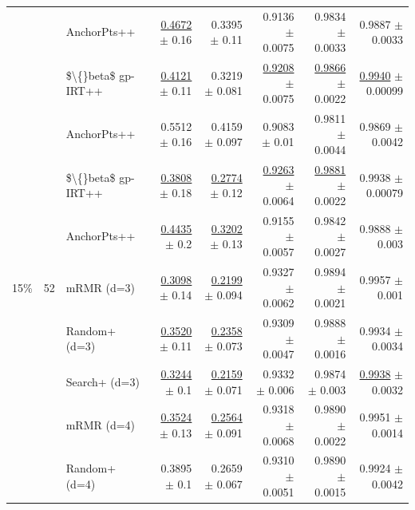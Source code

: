 \begin{longtable}{llp{}rrrrr}
 &  & AnchorPts++ & \underline{0.4672} {\scriptsize $\pm$ 0.16} & 0.3395 {\scriptsize $\pm$ 0.11} & 0.9136 {\scriptsize $\pm$ 0.0075} & 0.9834 {\scriptsize $\pm$ 0.0033} & 0.9887 {\scriptsize $\pm$ 0.0033} \\
 &  & \$\textbackslash\{\}beta\$ gp-IRT++ & \underline{0.4121} {\scriptsize $\pm$ 0.11} & 0.3219 {\scriptsize $\pm$ 0.081} & \underline{0.9208} {\scriptsize $\pm$ 0.0075} & \underline{0.9866} {\scriptsize $\pm$ 0.0022} & \underline{0.9940} {\scriptsize $\pm$ 0.00099} \\
 &  & AnchorPts++ & 0.5512 {\scriptsize $\pm$ 0.16} & 0.4159 {\scriptsize $\pm$ 0.097} & 0.9083 {\scriptsize $\pm$ 0.01} & 0.9811 {\scriptsize $\pm$ 0.0044} & 0.9869 {\scriptsize $\pm$ 0.0042} \\
 &  & \$\textbackslash\{\}beta\$ gp-IRT++ & \underline{0.3808} {\scriptsize $\pm$ 0.18} & \underline{0.2774} {\scriptsize $\pm$ 0.12} & \underline{0.9263} {\scriptsize $\pm$ 0.0064} & \underline{0.9881} {\scriptsize $\pm$ 0.0022} & 0.9938 {\scriptsize $\pm$ 0.00079} \\
 &  & AnchorPts++ & \underline{0.4435} {\scriptsize $\pm$ 0.2} & \underline{0.3202} {\scriptsize $\pm$ 0.13} & 0.9155 {\scriptsize $\pm$ 0.0057} & 0.9842 {\scriptsize $\pm$ 0.0027} & 0.9888 {\scriptsize $\pm$ 0.003} \\
\midrule
15\% & 52 & mRMR (d=3) & \underline{0.3098} {\scriptsize $\pm$ 0.14} & \underline{0.2199} {\scriptsize $\pm$ 0.094} & 0.9327 {\scriptsize $\pm$ 0.0062} & 0.9894 {\scriptsize $\pm$ 0.0021} & 0.9957 {\scriptsize $\pm$ 0.001} \\
 &  & Random+ (d=3) & \underline{0.3520} {\scriptsize $\pm$ 0.11} & \underline{0.2358} {\scriptsize $\pm$ 0.073} & 0.9309 {\scriptsize $\pm$ 0.0047} & 0.9888 {\scriptsize $\pm$ 0.0016} & 0.9934 {\scriptsize $\pm$ 0.0034} \\
 &  & Search+ (d=3) & \underline{0.3244} {\scriptsize $\pm$ 0.1} & \underline{0.2159} {\scriptsize $\pm$ 0.071} & 0.9332 {\scriptsize $\pm$ 0.006} & 0.9874 {\scriptsize $\pm$ 0.003} & \underline{0.9938} {\scriptsize $\pm$ 0.0032} \\
 &  & mRMR (d=4) & \underline{0.3524} {\scriptsize $\pm$ 0.13} & \underline{0.2564} {\scriptsize $\pm$ 0.091} & 0.9318 {\scriptsize $\pm$ 0.0068} & 0.9890 {\scriptsize $\pm$ 0.0022} & 0.9951 {\scriptsize $\pm$ 0.0014} \\
 &  & Random+ (d=4) & 0.3895 {\scriptsize $\pm$ 0.1} & 0.2659 {\scriptsize $\pm$ 0.067} & 0.9310 {\scriptsize $\pm$ 0.0051} & 0.9890 {\scriptsize $\pm$ 0.0015} & 0.9924 {\scriptsize $\pm$ 0.0042} \\

\end{longtable}
